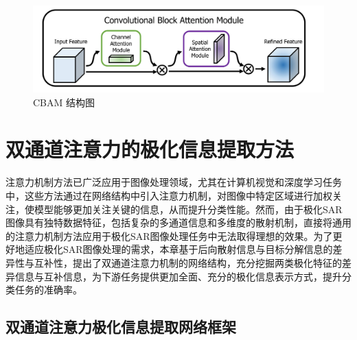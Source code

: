 \begin{figure}[h]
    \centering
    \includegraphics[width=14cm]{pic/chapter3/CBAM.jpg}
    \caption{CBAM 结构图}
    \label{CBAM}
\end{figure}

\section{双通道注意力的极化信息提取方法}

注意力机制方法已广泛应用于图像处理领域，尤其在计算机视觉和深度学习任务中，这些方法通过在网络结构中引入注意力机制，对图像中特定区域进行加权关注，使模型能够更加关注关键的信息，从而提升分类性能。然而，由于极化SAR图像具有独特数据特征，包括复杂的多通道信息和多维度的散射机制，直接将通用的注意力机制方法应用于极化SAR图像处理任务中无法取得理想的效果。为了更好地适应极化SAR图像处理的需求，本章基于后向散射信息与目标分解信息的差异性与互补性，提出了双通道注意力机制的网络结构，充分挖掘两类极化特征的差异信息与互补信息，为下游任务提供更加全面、充分的极化信息表示方式，提升分类任务的准确率。

\subsection{双通道注意力极化信息提取网络框架}

